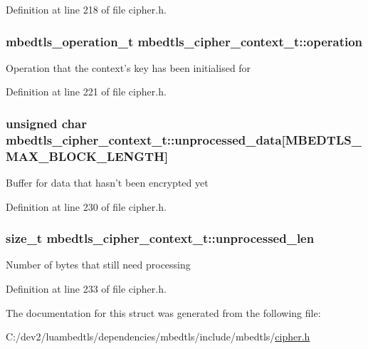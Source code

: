 Definition at line 218 of file cipher.\-h.

\hypertarget{structmbedtls__cipher__context__t_a0075f60f220daa87578223a2022ba405}{
\subsubsection[{operation}]{\setlength{\rightskip}{0pt plus 5cm}mbedtls\-\_\-operation\-\_\-t mbedtls\-\_\-cipher\-\_\-context\-\_\-t\-::operation}}\label{structmbedtls__cipher__context__t_a0075f60f220daa87578223a2022ba405}
Operation that the context's key has been initialised for 

Definition at line 221 of file cipher.\-h.

\hypertarget{structmbedtls__cipher__context__t_a3fc86dfa20e0131377692ee07fb5b8f0}{
\subsubsection[{unprocessed\-\_\-data}]{\setlength{\rightskip}{0pt plus 5cm}unsigned char mbedtls\-\_\-cipher\-\_\-context\-\_\-t\-::unprocessed\-\_\-data\mbox{[}{\bf M\-B\-E\-D\-T\-L\-S\-\_\-\-M\-A\-X\-\_\-\-B\-L\-O\-C\-K\-\_\-\-L\-E\-N\-G\-T\-H}\mbox{]}}}\label{structmbedtls__cipher__context__t_a3fc86dfa20e0131377692ee07fb5b8f0}
Buffer for data that hasn't been encrypted yet 

Definition at line 230 of file cipher.\-h.

\hypertarget{structmbedtls__cipher__context__t_ad9bb94ad0e914bdceb20190cfebfc702}{
\subsubsection[{unprocessed\-\_\-len}]{\setlength{\rightskip}{0pt plus 5cm}size\-\_\-t mbedtls\-\_\-cipher\-\_\-context\-\_\-t\-::unprocessed\-\_\-len}}\label{structmbedtls__cipher__context__t_ad9bb94ad0e914bdceb20190cfebfc702}
Number of bytes that still need processing 

Definition at line 233 of file cipher.\-h.



The documentation for this struct was generated from the following file\-:\begin{DoxyCompactItemize}
\item 
C\-:/dev2/luambedtls/dependencies/mbedtls/include/mbedtls/\hyperlink{cipher_8h}{cipher.\-h}\end{DoxyCompactItemize}
